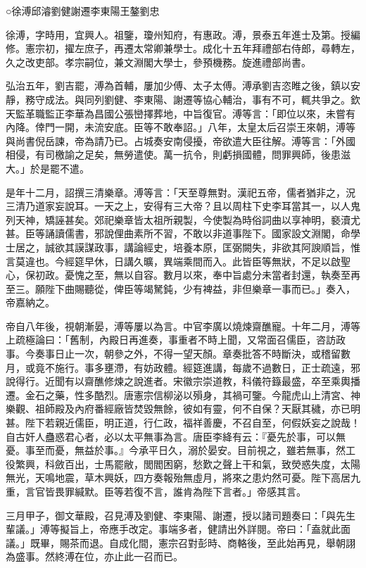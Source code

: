 
\begin{pinyinscope}
○徐溥邱濬劉健謝遷李東陽王鏊劉忠

徐溥，字時用，宜興人。祖鑒，瓊州知府，有惠政。溥，景泰五年進士及第。授編修。憲宗初，擢左庶子，再遷太常卿兼學士。成化十五年拜禮部右侍郎，尋轉左，久之改吏部。孝宗嗣位，兼文淵閣大學士，參預機務。旋進禮部尚書。

弘治五年，劉吉罷，溥為首輔，屢加少傅、太子太傅。溥承劉吉恣睢之後，鎮以安靜，務守成法。與同列劉健、李東陽、謝遷等協心輔治，事有不可，輒共爭之。欽天監革職監正李華為昌國公張巒擇葬地，中旨復官。溥等言：「即位以來，未嘗有內降。倖門一開，未流安底。臣等不敢奉詔。」八年，太皇太后召崇王來朝，溥等與尚書倪岳諫，帝為請乃已。占城奏安南侵擾，帝欲遣大臣往解。溥等言：「外國相侵，有司檄諭之足矣，無勞遣使。萬一抗令，則虧損國體，問罪興師，後患滋大。」於是罷不遣。

是年十二月，詔撰三清樂章。溥等言：「天至尊無對。漢祀五帝，儒者猶非之，況三清乃道家妄說耳。一天之上，安得有三大帝？且以周柱下史李耳當其一，以人鬼列天神，矯誣甚矣。郊祀樂章皆太祖所親製，今使製為時俗詞曲以享神明，褻瀆尤甚。臣等誦讀儒書，邪說俚曲素所不習，不敢以非道事陛下。國家設文淵閣，命學士居之，誠欲其謨謀政事，講論經史，培養本原，匡弼闕失，非欲其阿諛順旨，惟言莫違也。今經筵早休，日講久曠，異端乘間而入。此皆臣等無狀，不足以啟聖心，保初政。憂愧之至，無以自容。數月以來，奉中旨處分未當者封還，執奏至再至三。願陛下曲賜聽從，俾臣等竭駑鈍，少有裨益，非但樂章一事而已。」奏入，帝嘉納之。

帝自八年後，視朝漸晏，溥等屢以為言。中官李廣以燒煉齋醮寵。十年二月，溥等上疏極論曰：「舊制，內殿日再進奏，事重者不時上聞，又常面召儒臣，咨訪政事。今奏事日止一次，朝參之外，不得一望天顏。章奏批答不時斷決，或稽留數月，或竟不施行。事多壅滯，有妨政體。經筵進講，每歲不過數日，正士疏遠，邪說得行。近聞有以齋醮修煉之說進者。宋徽宗崇道教，科儀符籙最盛，卒至乘輿播遷。金石之藥，性多酷烈。唐憲宗信柳泌以殞身，其禍可鑒。今龍虎山上清宮、神樂觀、祖師殿及內府番經廠皆焚毀無餘，彼如有靈，何不自保？天厭其穢，亦已明甚。陛下若親近儒臣，明正道，行仁政，福祥善慶，不召自至，何假妖妄之說哉！自古奸人蠱惑君心者，必以太平無事為言。唐臣李絳有云：『憂先於事，可以無憂。事至而憂，無益於事。』今承平日久，溺於晏安。目前視之，雖若無事，然工役繁興，科斂百出，士馬罷敝，閭閻困窮，愁歎之聲上干和氣，致熒惑失度，太陽無光，天鳴地震，草木興妖，四方奏報殆無虛月，將來之患灼然可憂。陛下高居九重，言官皆畏罪緘默。臣等若復不言，誰肯為陛下言者。」帝感其言。

三月甲子，御文華殿，召見溥及劉健、李東陽、謝遷，授以諸司題奏曰：「與先生輩議。」溥等擬旨上，帝應手改定。事端多者，健請出外詳閱。帝曰：「盍就此面議。」既畢，賜茶而退。自成化間，憲宗召對彭時、商輅後，至此始再見，舉朝詡為盛事。然終溥在位，亦止此一召而已。


\end{pinyinscope}

